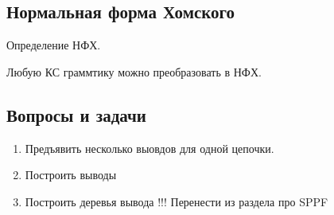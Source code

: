\subsection{Нормальная форма Хомского}
\label{section:CNF}

\begin{definition}
Определение НФХ.
\end{definition}

\begin{theorem}
Любую КС граммтику можно преобразовать в НФХ.
\end{theorem}


\subsection{Вопросы и задачи}
\begin{enumerate}
  \item Предъявить несколько выовдов для одной цепочки.
  \item Построить выводы
  \item Построить деревья вывода !!! Перенести из раздела про SPPF
\end{enumerate}
